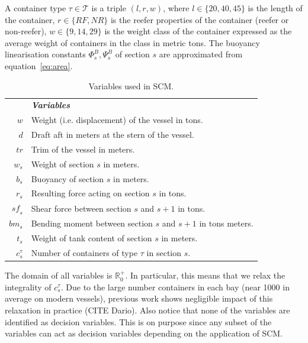 \documentclass[runningheads]{llncs}
\begin{document}
A container type $\tau \in \mathcal{T}$ is a triple $(l,r,w)$, where $l \in \{20,40,45\}$ is the length of the container, $r \in \{ \mathit{RF},\mathit{NR} \}$ is the reefer properties of the container (reefer or non-reefer), $w \in \{9,14,29\}$ is the weight class of the container expressed as the average weight of containers in the class in metric tons. The buoyancy linearisation constants $\Phi^B_s,\Psi^B_s$ of section $s$ are approximated from equation~\ref{eq:area}.


\begin{table} [!ht]
\begin{center}
\begin{tabular}{rl}
    & \textbf{\textit{Variables}}\\
    $w$             & Weight (i.e. displacement) of the vessel in tons.\\
    $d$             & Draft aft in meters at the stern of the vessel.\\
    $\mathit{tr}$   & Trim of the vessel in meters.\\
    $w_s$           & Weight of section $s$ in meters.\\
    $b_s$           & Buoyancy of section $s$ in meters.\\
    $r_s$           & Resulting force acting on section $s$ in tons.\\
    $\mathit{sf}_s$ & Shear force between section $s$ and $s+1$ in tons. \\
    $\mathit{bm}_s$ & Bending moment between section $s$ and $s+1$ in tons meters. \\
    $t_s$           & Weight of tank content of section $s$ in meters.\\ 
    $c^\tau_s$      & Number of containers of type $\tau$ in section $s$.
\end{tabular}
\end{center}
\caption{Variables used in SCM.}
\label{tab:variables}
\end{table}

The domain of all variables is $\mathbb{R}^+_0$. In particular, this means that we relax the integrality of $c^\tau_s$. Due to the large number containers in each bay (near 1000 in average on modern vessels), previous work shows negligible impact of this relaxation in practice (CITE Dario). Also notice that none of the variables are identified as decision variables. This is on purpose since any subset of the variables can act as decision variables depending on the application of SCM.
\end{document}
